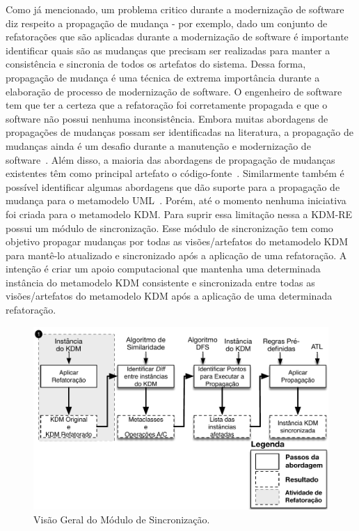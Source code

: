 Como já mencionado, um problema critico durante a modernização de software diz respeito a propagação de mudança - por exemplo, dado um conjunto de refatorações que são aplicadas durante a modernização de software é importante identificar quais são as mudanças que precisam ser realizadas para manter a consistência e sincronia de todos os artefatos do sistema. Dessa forma, propagação de mudança é uma técnica de extrema importância durante a elaboração de processo de modernização de software. O engenheiro de software tem que ter a certeza que a refatoração foi corretamente propagada e que o software não possui nenhuma inconsistência. Embora muitas abordagens de propagações de mudanças possam ser identificadas na literatura, a propagação de mudanças ainda é um desafio durante a manutenção e modernização de software~\cite{Tom_2008_roadmap}. Além disso, a maioria das abordagens de propagação de mudanças existentes têm como principal artefato o código-fonte~\cite{Vaclav_methodology, Deursen07model_drivensoftware}. Similarmente também é possível identificar algumas abordagens que dão suporte para a propagação de mudança para o metamodelo UML~\cite{Egyed_2008,Liu02rule, Briand_2006}. Porém, até o momento nenhuma iniciativa foi criada para o metamodelo KDM. Para suprir essa limitação nessa a KDM-RE possui um módulo de sincronização. Esse módulo de sincronização tem como objetivo propagar mudanças por todas as visões/artefatos do metamodelo KDM para mantê-lo atualizado e sincronizado após a aplicação de uma refatoração. A intenção é criar um apoio computacional que mantenha uma determinada instância do metamodelo KDM consistente e sincronizada entre todas as visões/artefatos do metamodelo KDM após a aplicação de uma determinada refatoração. 

\begin{figure}[h]
	\centering
	\caption{Visão Geral do Módulo de Sincronização.}
	\label{fig:kdm_sinc}
	\includegraphics[scale=0.65]{images/AbordagemKDM_SInc}
	\fautor
\end{figure}


